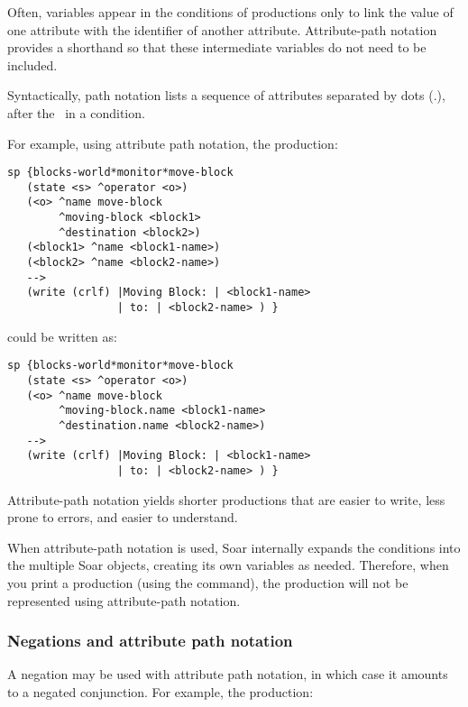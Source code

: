 Often, variables appear in the conditions of productions only to link the value of one attribute with the identifier of another attribute. Attribute-path notation provides a shorthand so that these intermediate variables do not need to be included.

Syntactically, path notation lists a sequence of attributes separated by dots (.), after the \carat \ in a condition.

For example, using attribute path notation, the production:

\begin{verbatim}
sp {blocks-world*monitor*move-block
   (state <s> ^operator <o>)
   (<o> ^name move-block
        ^moving-block <block1>
        ^destination <block2>)
   (<block1> ^name <block1-name>)
   (<block2> ^name <block2-name>)
   -->
   (write (crlf) |Moving Block: | <block1-name>
                 | to: | <block2-name> ) }
\end{verbatim}

could be written as:

\begin{verbatim}
sp {blocks-world*monitor*move-block
   (state <s> ^operator <o>)
   (<o> ^name move-block
        ^moving-block.name <block1-name>
        ^destination.name <block2-name>)
   -->
   (write (crlf) |Moving Block: | <block1-name>
                 | to: | <block2-name> ) }
\end{verbatim}

Attribute-path notation yields shorter productions that are easier to write, less prone to errors, and easier to understand.

When attribute-path notation is used, Soar internally expands the conditions into the multiple Soar objects, creating its own variables as needed. Therefore, when you print a production (using the  command), the production will not be represented using attribute-path notation.


\subsubsection*{Negations and attribute path notation}


A negation may be used with attribute path notation, in which case it amounts
to a negated conjunction. For example, the production:

